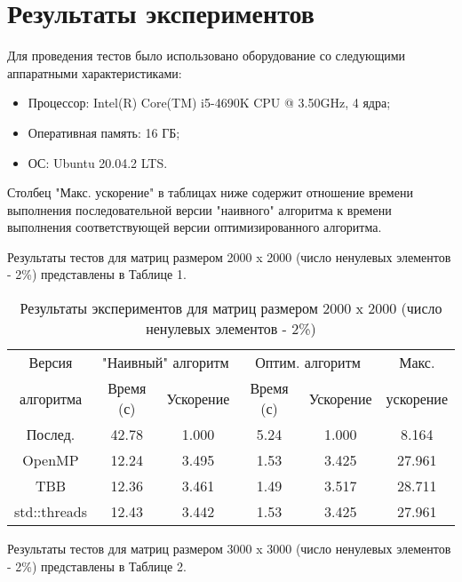 \documentclass{report}
\begin{document}
	\section*{Результаты экспериментов}
	\par Для проведения тестов было использовано оборудование со следующими аппаратными характеристиками:
	\begin{itemize}
		\item Процессор: Intel(R) Core(TM) i5-4690K CPU @ 3.50GHz, 4 ядра;
		\item Оперативная память: 16 ГБ;
		\item ОС: Ubuntu 20.04.2 LTS.
	\end{itemize}
	\par Столбец "Макс. ускорение"{} в таблицах ниже содержит отношение времени выполнения последовательной версии "наивного"{} алгоритма к времени выполнения соответствующей версии оптимизированного алгоритма.
	\par Результаты тестов для матриц размером 2000 x 2000 (число ненулевых элементов - 2\%) представлены в Таблице 1.
	\begin{table}[!h]
		\caption{Результаты экспериментов для матриц размером 2000 x 2000 (число ненулевых элементов - 2\%)}
		\centering
		\begin{tabular}{|c|c|c|c|c|c|}
			\hline
			Версия &
			\multicolumn{2}{|c|}{"Наивный"{} алгоритм} &
			\multicolumn{2}{|c|}{Оптим. алгоритм} &
			Макс. \\
			\cline{2-5}
			алгоритма	&  Время (с)  &  Ускорение  &   Время (с)  &  Ускорение  &  ускорение   \\
			\hline
			Послед.	&	42.78	&	1.000	&	5.24	&	1.000	&	8.164	\\
			\hline
			OpenMP			&	12.24	&	3.495	&	1.53	&	3.425	&	27.961	\\
			\hline
			TBB				&	12.36	&	3.461	&	1.49	&	3.517	&	28.711	\\
			\hline
			std::threads		&	12.43	&	3.442	&	1.53	&	3.425	&	27.961	\\
			\hline
		\end{tabular}
	\end{table}
	\par Результаты тестов для матриц размером 3000 x 3000 (число ненулевых элементов - 2\%) представлены в Таблице 2.
\end{document}
